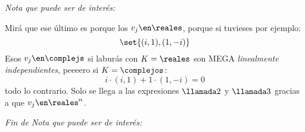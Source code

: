 \begin{itemize}
        \bigskip

        \textit{Nota que puede ser de interés:}

        Mirá que ese último \red{!!} es porque los $v_j \en \reales$, porque si tuvieses por ejemplo:
        $$
          \set{(i,1), (1,-i)}
        $$
        Esos $v_j \en \complejs$ si laburás con $K = \reales$ son {\large{MEGA}} \textit{linealmente independientes},
        peeeero si $K = \complejos$:
        $$
          i\cdot (i, 1) + 1\cdot(1,-i) = 0
        $$
        todo lo contrario. Solo se llega a las expresiones $\llamada2$ y $\llamada3$ gracias a que $v_j \en \reales^n$.

        \textit{Fin de Nota que puede ser de interés:}
\end{itemize}

\begin{aportes}
  \item {}
\end{aportes}

